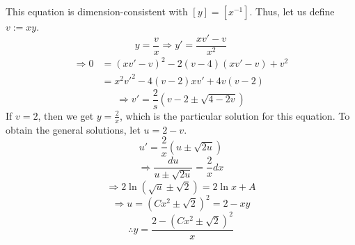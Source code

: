 \item

This equation is dimension-consistent with $[y] = [x^{-1}]$.
Thus, let us define $v := xy$.
\[
	y = \frac{v}{x}
	\Rightarrow y' = \frac{xv' - v}{x^2}
\]
\begin{align*}
	\Rightarrow 0
	 & = {\left( xv' - v \right)}^2 - 2(v - 4)\left( xv' - v\right) + v^2 \\
	 & = x^2 v'^2 - 4(v - 2) x v' + 4v(v - 2)
\end{align*}
\[
	\Rightarrow v' = \frac{2}{s}\left( v - 2 \pm \sqrt{4 - 2v} \right)
\]
If $v = 2$, then we get $y = \frac{2}{x}$, which is the particular solution for this equation.
To obtain the general solutions, let $u = 2 - v$.
\[
	u' = \frac{2}{x} \left( u \pm \sqrt{2u} \right)
\]
\[
	\Rightarrow \frac{du}{u \pm \sqrt{2u}} = \frac{2}{x} dx
\]
\[
	\Rightarrow 2 \ln \left( \sqrt{u} \pm \sqrt{2} \right) = 2 \ln x + A
\]
\[
	\Rightarrow u = {\left( Cx^2 \pm \sqrt{2} \right)}^2 = 2 - xy
\]
\[
	\therefore y = \frac{2 - {\left( Cx^2 \pm \sqrt{2} \right)}^2}{x}
\]
